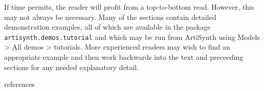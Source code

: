 \documentclass{article}
\begin{document}
If time permits, the reader will profit from a top-to-bottom read.
However, this may not always be necessary. Many of the sections
contain detailed demonstration examples, all of which are available in
the package {\tt artisynth.demos.tutorial} and which may be run from
ArtiSynth using {\sf Models > All demos > tutorials}. 
More experienced readers may wish to find an appropriate example and
then work backwards into the text and preceeding sections for any
needed explanatory detail.















\iflatexml


\else

\begin{btSect}{references}
\btPrintCited
\end{btSect}
\fi
\end{document}
